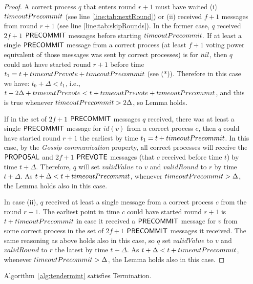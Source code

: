 \begin{proof}
A correct process $q$ that enters round $r+1$ must have waited (i) $timeoutPrecommit$ (see line \ref{line:tab:nextRound}) or (ii) received $f+1$ messages from round $r+1$ (see line \ref{line:tab:skipRounds}). 
In the former case, $q$ received $2f+1$ $\mathsf{PRECOMMIT}$ messages before starting $timeoutPrecommit$. If at least a single $\mathsf{PRECOMMIT}$ message from a correct process (at least $f+1$ voting power equivalent of those messages was sent by correct processes) is for $nil$, then $q$ could not have started round $r+1$ before time $t_1 = t + timeoutPrevote + timeoutPrecommit$ (see (*)). Therefore in this case we have: $t_0 + \Delta < t_1$, i.e., 
$t+2\Delta+timeoutPrevote <  t + timeoutPrevote + timeoutPrecommit$, and this is true whenever $timeoutPrecommit > 2\Delta$, so Lemma holds.

If in the set of $2f+1$ $\mathsf{PRECOMMIT}$ messages $q$ received, there was at least a single $\mathsf{PRECOMMIT}$ message for $id(v)$ from a correct process $c$, 
then $q$ could have started round $r+1$ the earliest by time $t_1 = t+timeoutPrecommit$. In this case,
by the \emph{Gossip communication} property, all correct processes will receive the $\mathsf{PROPOSAL}$ and $2f+1$ $\mathsf{PREVOTE}$ messages (that $c$ received before time $t$) by time $t+\Delta$. Therefore, $q$ will set $validValue$ to $v$ and $validRound$ to $r$ by time $t+\Delta$. As $t+\Delta < t+timeoutPrecommit$, whenever $timeoutPrecommit > \Delta$, the Lemma holds also in this case.    

In case (ii), $q$ received at least a single message from a correct process $c$ from the round
$r+1$. The earliest point in time $c$ could have started round $r+1$ is $t+timeoutPrecommit$ in case it received a $\mathsf{PRECOMMIT}$ message for $v$ from some correct process in the set of $2f+1$ $\mathsf{PRECOMMIT}$ messages it received. The same reasoning as above holds also in this case, so $q$ set $validValue$ to $v$ and $validRound$ to $r$ the latest by time $t+\Delta$. As $t+\Delta < t+timeoutPrecommit$, whenever $timeoutPrecommit > \Delta$, the Lemma holds also in this case.    
\end{proof}

\begin{lemma}
	\label{lemma:agreement}
Algorithm~\ref{alg:tendermint} satisfies Termination. 
\end{lemma}

